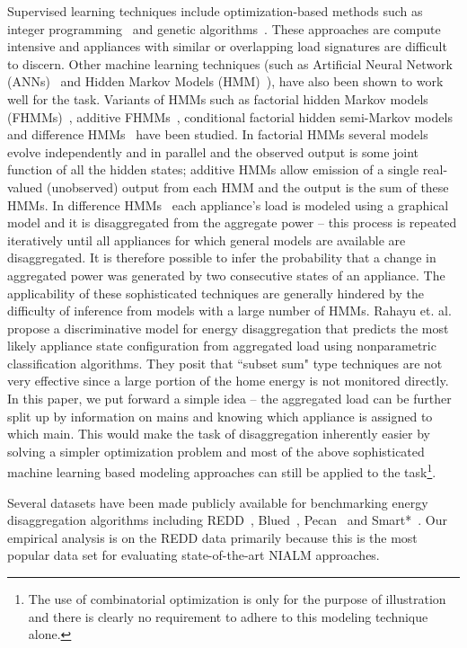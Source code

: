 \documentclass[conference]{IEEEtran}
\begin{document}
\noindent Supervised learning techniques include optimization-based methods such as integer programming~\cite{Suzuki_08} and genetic algorithms~\cite{Baranski_04}. These approaches are compute intensive and appliances with similar or overlapping load signatures are difficult to discern. Other machine learning techniques (such as Artificial Neural Network (ANNs)~\cite{Ruzzelli_10} and Hidden Markov Models (HMM)~\cite{Zia_11}), have also been shown to work well for the task. Variants of HMMs such as factorial hidden Markov models (FHMMs)~\cite{Ghahramani_97a}, additive FHMMs~\cite{Kolter_12}, conditional factorial hidden semi-Markov models~\cite{Kim_11} and difference HMMs~\cite{parson2012_aaai} have been studied. In factorial HMMs several models evolve independently and in parallel and the observed output is some joint function of all the hidden states; additive HMMs allow emission of a single real-valued (unobserved) output from each HMM and the output is the sum of these HMMs. In difference HMMs~\cite{parson2012_aaai} each appliance's load is modeled using a graphical model and it is disaggregated from the aggregate power -- this process is repeated iteratively until all appliances for which general models are available are disaggregated. It is therefore possible to infer the probability that a change in aggregated power was generated by two consecutive states of an appliance. The applicability of these sophisticated techniques are generally hindered by the difficulty of inference from models with a large number of HMMs. Rahayu et. al.~\cite{Rahayu_12} propose a discriminative model for energy disaggregation that predicts the most likely appliance state configuration from aggregated load using nonparametric classification algorithms. They posit that ``subset sum" type techniques are not very effective since a large portion of the home energy is not monitored directly. In this paper, we put forward a simple idea -- the aggregated load can be further split up by information on mains and knowing which appliance is assigned to which main. This would make the task of disaggregation inherently easier by solving a simpler optimization problem and most of the above sophisticated machine learning based modeling approaches can still be applied to the task\footnote{The use of combinatorial optimization is only for the purpose of illustration and there is clearly no requirement to adhere to this modeling technique alone.}. 

\noindent Several datasets have been made publicly available for benchmarking energy disaggregation algorithms including REDD~\cite{redd}, Blued~\cite{blued_cmu}, Pecan~\cite{pecan} and Smart*~\cite{smart}. Our empirical analysis is on the REDD data primarily because this is the most popular data set for evaluating state-of-the-art NIALM approaches. 
\end{document}

